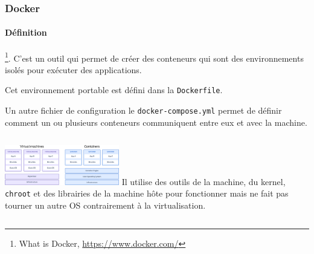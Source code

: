 \documentclass{beamer}
\begin{document}
    \begin{frame}
        \transdissolve
        \frametitle{Docker}
        \framesubtitle{Définition}
        \footnote{What is Docker, \url{https://www.docker.com/}}.
        \bigbreak
        C'est un outil qui permet de créer des conteneurs qui sont des environnements isolés pour exécuter des applications.

        Cet environnement portable est défini dans la \lstinline{Dockerfile}.

        Un autre fichier de configuration le \lstinline{docker-compose.yml} permet de définir comment un ou plusieurs conteneurs communiquent entre eux et avec la machine.
        \bigbreak
        \begin{columns}
            \centering
            \includegraphics[width=5cm]{image/docker-vs-vm}\footnotemark
            Il utilise des outils de la machine, du kernel, \lstinline{chroot} et des librairies de la machine hôte pour fonctionner mais ne fait pas tourner un autre OS contrairement à la virtualisation.
        \end{columns}
    \end{frame}
\end{document}
